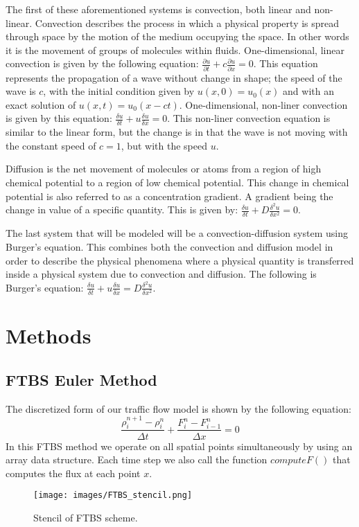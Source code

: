 \documentclass{article}
\begin{document}
The first of these aforementioned systems is convection, both linear and non-linear. Convection describes the process in which a physical property is spread through space by the motion of the medium occupying the space. In other words it is the movement of groups of molecules within fluids. One-dimensional, linear convection is given by the following equation: $\frac{\partial u}{\partial t}+c\frac{\partial u}{\partial x}=0.$ This equation represents the propagation of a wave without change in shape; the speed of the wave is $c$, with the initial condition given by $u(x,0) = u_{0}(x)$ and with an exact solution of $u(x,t) = u_{0}(x-ct)$. One-dimensional, non-liner convection is given by this equation: $\frac{\delta u}{\delta t}+u\frac{\delta u}{\delta x}=0.$ This non-liner convection equation is similar to the linear form, but the change is in that the wave is not moving with the constant speed of $c = 1$, but with the speed $u.$\par
Diffusion is the net movement of molecules or atoms from a region of high chemical potential to a region of low chemical potential. This change in chemical potential is also referred to as a concentration gradient. A gradient being the change in value of a specific quantity. This is given by: $\frac{\delta u}{\delta t}+D\frac{\delta^2 u}{\delta x^2}=0$.\par
The last system that will be modeled will be a convection-diffusion system using Burger’s equation. This combines both the convection and diffusion model in order to describe the physical phenomena where a physical quantity is transferred inside a physical system due to convection and diffusion. The following is Burger's equation: $\frac{\delta u}{\delta t}+u\frac{\delta u}{\delta x} = D\frac{\delta^2 u}{\delta x^2}.$\\



\section{Methods}

\subsection{FTBS Euler Method}
The discretized form of our traffic flow model is shown by the following equation:
\begin{equation}
\frac{\rho^{n+1}_i- \rho^n_{i}}{\Delta t}+ \frac{F^n_{i}-F^n_{i-1}}{\Delta x}=0
\end{equation}
In this FTBS method we operate on all spatial points simultaneously by using an array data structure. Each time step we also call the function $computeF()$ that computes the flux at each point $x.$
\begin{figure}[H]
\begin{center}
\texttt{[image: images/FTBS\_stencil.png]}
\caption{Stencil of FTBS scheme.}
\end{center}
\end{figure}
\end{document}
